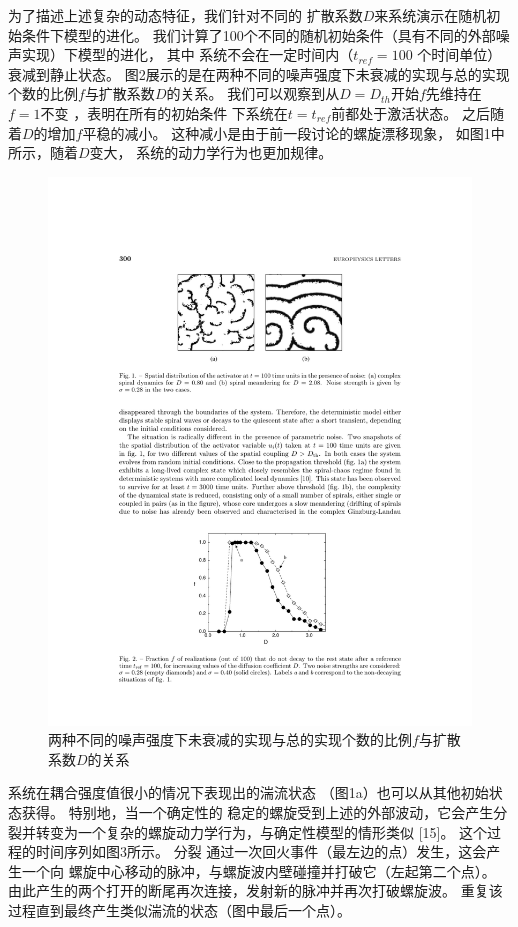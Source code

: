 \documentclass[
    bachelor,
    nofont, %
    pdflinks,
    ]{xjtuthesis}
\begin{document}
\medskip
为了描述上述复杂的动态特征，我们针对不同的
扩散系数$D$来系统演示在随机初始条件下模型的进化。 我们计算了100个不同的随机初始条件（具有不同的外部噪声实现）下模型的进化， 其中
系统不会在一定时间内（$t_{ref} = 100$
个时间单位）衰减到静⽌状态。 图2展示的是在两种不同的噪声强度下未衰减的实现与总的实现个数的比例$f$与扩散系数$D$的关系。 我们可以观察到从$D = D_{th}$开始$f$先维持在 $f = 1$不变 ，表明在所有的初始条件
下系统在$t=t_{ref}$前都处于激活状态。 之后随着$D$的增加$f$平稳的减小。 这种减小是由于前⼀段讨论的螺旋漂移现象，
如图1中所示，随着$D$变⼤， 系统的动力学行为也更加规律。

\begin{figure}[!ht]
\centering
\includegraphics[scale=1]{fig2.pdf}
\caption{两种不同的噪声强度下未衰减的实现与总的实现个数的比例$f$与扩散系数$D$的关系}
\end{figure}

\medskip
系统在耦合强度值很⼩的情况下表现出的湍流状态
（图1a）也可以从其他初始状态获得。 特别地，当⼀个确定性的
稳定的螺旋受到上述的外部波动，它会产生分裂并转变为一个复杂的螺旋动⼒学行为，与确定性模型的情形类似
[15]。 这个过程的时间序列如图3所⽰。 分裂
通过一次回⽕事件（最左边的点）发⽣，这会产⽣⼀个向
螺旋中⼼移动的脉冲，与螺旋波内壁碰撞并打破它（左起第⼆个点）。 由此产生的两个打开的断尾再次连接，发射新的脉冲并再次打破螺旋波。
重复该过程直到最终产⽣类似湍流的状态（图中最后⼀个点）。
\end{document}
